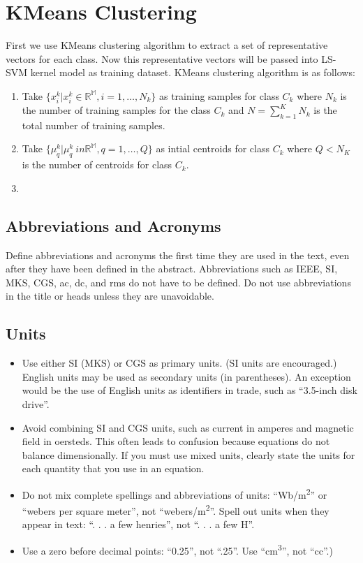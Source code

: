 \documentclass[conference]{IEEEtran}
\begin{document}
    \section{KMeans Clustering}
    First we use KMeans clustering algorithm to extract a set of representative vectors for each class.
    Now this representative vectors will be passed into LS-SVM kernel model as training dataset.
    KMeans clustering algorithm is as follows:
    \begin{enumerate}
    \item Take $\{x_{i}^{k}|x_{i}^{k} \in \mathbb{R^{M}}, i=1,\ldots,N_{k}\}$ as training samples for class $C_{k}$ where
    $N_{k}$ is the number of training samples for the class $C_{k}$ and $N = \sum_{k=1}^{K}N_{k}$ is the total
    number of training samples.

    \item Take $\{\mu_{q}^{k}|\mu_{q}^{k} \ in \mathbb{R^{M}}, q=1,\ldots,Q \}$ as intial centroids
    for class $C_{k}$ where $Q<N_{K}$ is the number of centroids for class $C_{k}$. \\

    \item
    \end{enumerate}

    \subsection{Abbreviations and Acronyms}\label{AA}
    Define abbreviations and acronyms the first time they are used in the text,
    even after they have been defined in the abstract. Abbreviations such as
    IEEE, SI, MKS, CGS, ac, dc, and rms do not have to be defined. Do not use
    abbreviations in the title or heads unless they are unavoidable.

    \subsection{Units}
    \begin{itemize}
        \item Use either SI (MKS) or CGS as primary units. (SI units are encouraged.) English units may be used as secondary units (in parentheses). An exception would be the use of English units as identifiers in trade, such as ``3.5-inch disk drive''.
        \item Avoid combining SI and CGS units, such as current in amperes and magnetic field in oersteds. This often leads to confusion because equations do not balance dimensionally. If you must use mixed units, clearly state the units for each quantity that you use in an equation.
        \item Do not mix complete spellings and abbreviations of units: ``Wb/m\textsuperscript{2}'' or ``webers per square meter'', not ``webers/m\textsuperscript{2}''. Spell out units when they appear in text: ``. . . a few henries'', not ``. . . a few H''.
        \item Use a zero before decimal points: ``0.25'', not ``.25''. Use ``cm\textsuperscript{3}'', not ``cc''.)
    \end{itemize}
\end{document}
